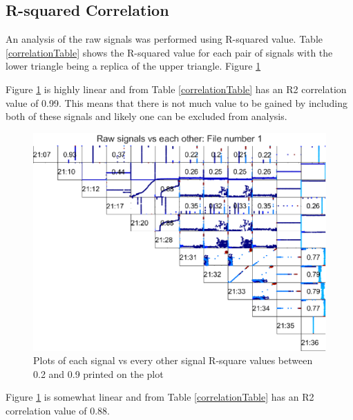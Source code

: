 \documentclass{article}
\begin{document}
\subsection{R-squared Correlation}
An analysis of the raw signals was performed using R-squared value. Table \ref{correlationTable} shows the R-squared value for each pair of signals with the lower triangle being a replica of the upper triangle. 
Figure \ref{fig:RawSignalCorrelationsFile1}
\begin{center}
    
\label{correlationTable}
\end{center}
Figure \ref{fig:RawSignalCorrelationsFile1} is highly linear and from Table \ref{correlationTable} has an R2 correlation value of 0.99. This means that there is not much value to be gained by including both of these signals and likely one can be excluded from analysis.

\begin{figure}[H]
    \centering
    \includegraphics[width=\textwidth, height=\textheight, keepaspectratio]{figures/RawSignalCorrelationsFile1.eps}
    \caption{Plots of each signal vs every other signal R-square values between 0.2 and 0.9 printed on the plot}
    \label{fig:RawSignalCorrelationsFile1}
\end{figure}

Figure \ref{fig:RawSignalCorrelationsFile1} is somewhat linear and from Table \ref{correlationTable} has an R2 correlation value of 0.88.
\end{document}
